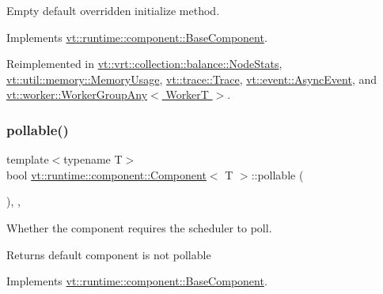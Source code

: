 Empty default overridden initialize method. 



Implements \hyperlink{structvt_1_1runtime_1_1component_1_1_base_component_ae361291ee8a37325580e59fb4030bc3a}{vt\+::runtime\+::component\+::\+Base\+Component}.



Reimplemented in \hyperlink{structvt_1_1vrt_1_1collection_1_1balance_1_1_node_stats_a0c60d1566daa6465f56b09e27058d6a1}{vt\+::vrt\+::collection\+::balance\+::\+Node\+Stats}, \hyperlink{structvt_1_1util_1_1memory_1_1_memory_usage_add66c6cdabed24194310380c5a28951a}{vt\+::util\+::memory\+::\+Memory\+Usage}, \hyperlink{structvt_1_1trace_1_1_trace_a24019edd964c0a307008f8d6a0f1f825}{vt\+::trace\+::\+Trace}, \hyperlink{structvt_1_1event_1_1_async_event_ac8d9f977b1cca3f43a06d0e83bc88e3d}{vt\+::event\+::\+Async\+Event}, and \hyperlink{structvt_1_1worker_1_1_worker_group_any_ad8bb855b98bf26337ca13df2bff5fb95}{vt\+::worker\+::\+Worker\+Group\+Any$<$ Worker\+T $>$}.

\mbox{\label{structvt_1_1runtime_1_1component_1_1_component_a5a15bd0369a9d3765a6c70249bada96f}} 
\subsubsection{\texorpdfstring{pollable()}{pollable()}}
{\footnotesize\ttfamily template$<$typename T$>$ \\
bool \hyperlink{structvt_1_1runtime_1_1component_1_1_component}{vt\+::runtime\+::component\+::\+Component}$<$ T $>$\+::pollable (\begin{DoxyParamCaption}{ }\end{DoxyParamCaption})\hspace{0.3cm}{\ttfamily [inline]}, {\ttfamily [override]}, {\ttfamily [virtual]}}



Whether the component requires the scheduler to poll. 

\begin{DoxyReturn}{Returns}
default component is not pollable 
\end{DoxyReturn}


Implements \hyperlink{structvt_1_1runtime_1_1component_1_1_base_component_ab651a49e6d4d3d8ca9e82a6b4b10af66}{vt\+::runtime\+::component\+::\+Base\+Component}.



